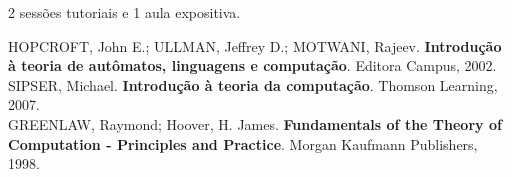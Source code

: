 
2 sessões tutoriais e 1 aula expositiva.


\noindent
HOPCROFT, John E.; ULLMAN, Jeffrey D.; MOTWANI, Rajeev. \textbf{Introdução à teoria de autômatos, linguagens e computação}. Editora Campus, 2002.\\

\noindent
SIPSER, Michael. \textbf{Introdução à teoria da computação}. Thomson Learning, 2007.\\

\noindent
GREENLAW, Raymond; Hoover, H. James. \textbf{Fundamentals of the Theory of Computation - Principles and Practice}. Morgan Kaufmann Publishers, 1998.\\


